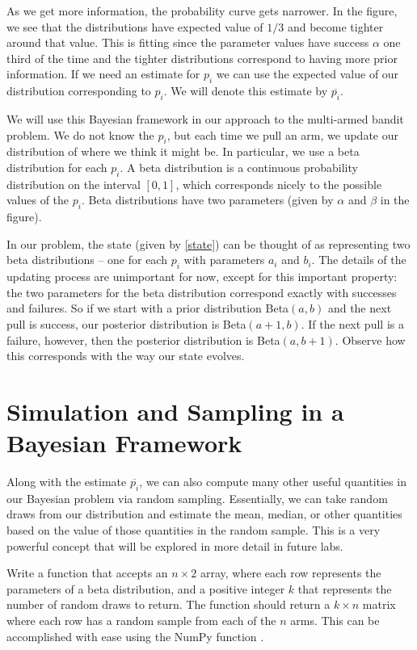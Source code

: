 As we get more information, the probability curve gets narrower.
In the figure, we see that the distributions have expected
value of $1/3$ and become tighter around that value.
This is fitting since the parameter values have success $\alpha$ one
third of the time and the tighter distributions correspond to having
more prior information.  If we need an estimate for $p_i$ we can use
the expected value of our distribution corresponding to $p_i$.
We will denote this estimate by $\overline{p_i}$.

We will use this Bayesian framework in our approach to the multi-armed bandit problem.
We do not know the $p_i$, but each time we pull an arm, we update our distribution of 
where we think it might be.
In particular, we use a beta distribution for each $p_i$.
A beta distribution is a continuous probability distribution on the interval $[0,1]$,
which corresponds nicely to the possible values of the $p_i$.  Beta distributions have 
two parameters (given by $\alpha$ and $\beta$ in the figure).

In our problem, the state (given by \eqref{state}) can be thought of as representing two 
beta distributions -- one for each $p_i$ with parameters $a_i$ and $b_i$.
The details of the updating process are unimportant for now, except
for this important property: the two parameters for the beta distribution 
correspond exactly with successes and failures. 
So if we start with a prior distribution Beta$(a,b)$ and the next pull is success, 
our posterior distribution is Beta$(a+1,b)$. If the next pull is a failure, however, then 
the posterior distribution is Beta$(a,b+1)$.
Observe how this corresponds with the way our state evolves.

\section*{Simulation and Sampling in a Bayesian Framework}
Along with the estimate $\overline{p_i}$, we can also compute many other useful
quantities in our Bayesian problem via random sampling.  Essentially, we can take
random draws from our distribution and estimate the mean, median, or other
quantities based on the value of those quantities in the random sample.
This is a very powerful concept that will be explored in more detail in future labs.

\begin{problem}
Write a function  that accepts an $n\times 2$ array, where each
row represents the parameters of a beta distribution, and a positive integer $k$
that represents the number of random draws to return.
The function should return a $k\times n$ matrix where each row has a random sample
from each of the $n$ arms.  This can be accomplished with ease using the NumPy function
.
\label{prob:simdata}
\end{problem}

